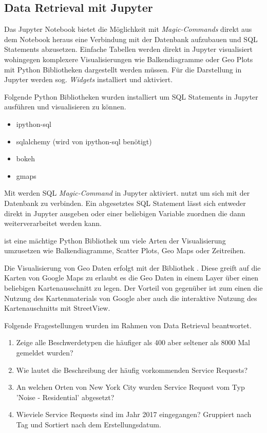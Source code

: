 \subsection{Data Retrieval mit Jupyter}
Das Jupyter Notebook bietet die Möglichkeit mit \textit{Magic-Commands} direkt aus dem Notebook heraus
eine Verbindung mit der Datenbank aufzubauen und \ac{SQL} Statements abzusetzen.
Einfache Tabellen werden direkt in Jupyter visualisiert wohingegen komplexere Visualisierungen wie \zb{}
Balkendiagramme oder Geo Plots mit Python Bibliotheken dargestellt werden müssen.
Für die Darstellung in Jupyter werden sog. \textit{Widgets} installiert und aktiviert.


Folgende Python Bibliotheken wurden installiert um \ac{SQL} Statements in Jupyter ausführen und visualisieren zu können.
\begin{itemize}
  \item ipython-sql
  \item sqlalchemy (wird von ipython-sql benötigt)
  \item bokeh
  \item gmaps
\end{itemize}

Mit  werden \ac{SQL} \textit{Magic-Command} in Jupyter aktiviert.
 nutzt  um sich mit der Datenbank zu verbinden.
Ein abgesetztes \ac{SQL} Statement lässt sich entweder direkt in Jupyter ausgeben
oder einer beliebigen Variable zuordnen die dann weiterverarbeitet werden kann.


  ist eine mächtige Python Bibliothek um viele Arten der Visualisierung umzusetzen
 wie \zb{} Balkendiagramme, Scatter Plots, Geo Maps oder Zeitreihen.


 Die Visualisierung von Geo Daten erfolgt mit der Bibliothek .
 Diese greift auf die Karten von Google Maps zu erlaubt es die Geo Daten in einem Layer über einen
 beliebigen Kartenausschnitt zu legen.
 Der Vorteil von  gegenüber  ist
 zum einen die Nutzung des Kartenmaterials von Google aber auch die interaktive Nutzung
 des Kartenauschnitts mit \zb{} StreetView.


Folgende Fragestellungen wurden im Rahmen von Data Retrieval beantwortet.

\begin{enumerate}
  \item Zeige alle Beschwerdetypen die häufiger als 400 aber seltener als 8000 Mal gemeldet wurden?
  \item Wie lautet die Beschreibung der häufig vorkommenden Service Requests?
  \item An welchen Orten von New York City wurden Service Request vom Typ 'Noise - Residential' abgesetzt?
  \item Wieviele Service Requests sind im Jahr 2017 eingegangen? Gruppiert nach Tag und Sortiert nach dem Erstellungsdatum.
\end{enumerate}

